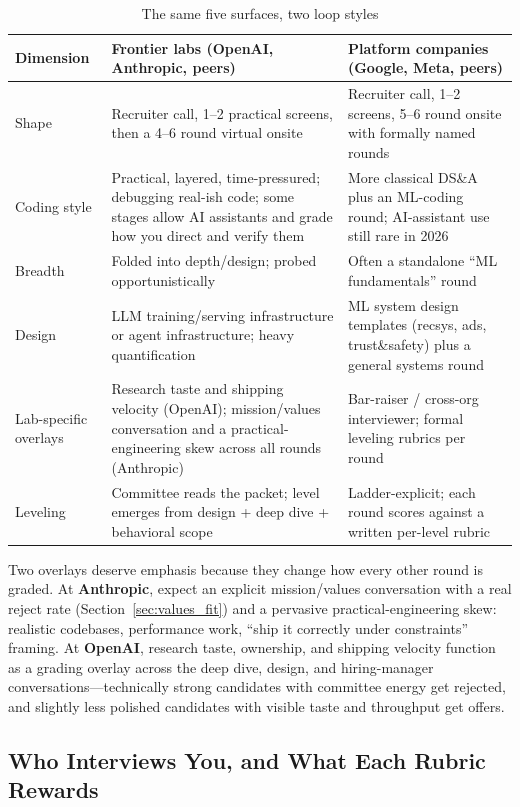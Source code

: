 \begin{table}[H]
\centering
\small
\caption{The same five surfaces, two loop styles}
\label{tab:loop_styles}
\begin{tabularx}{\textwidth}{lXX}
\toprule
\textbf{Dimension} & \textbf{Frontier labs (OpenAI, Anthropic, peers)} & \textbf{Platform companies (Google, Meta, peers)} \\
\midrule
Shape & Recruiter call, 1--2 practical screens, then a 4--6 round virtual onsite & Recruiter call, 1--2 screens, 5--6 round onsite with formally named rounds \\
Coding style & Practical, layered, time-pressured; debugging real-ish code; some stages allow AI assistants and grade how you direct and verify them & More classical DS\&A plus an ML-coding round; AI-assistant use still rare in 2026 \\
Breadth & Folded into depth/design; probed opportunistically & Often a standalone ``ML fundamentals'' round \\
Design & LLM training/serving infrastructure or agent infrastructure; heavy quantification & ML system design templates (recsys, ads, trust\&safety) plus a general systems round \\
Lab-specific overlays & Research taste and shipping velocity (OpenAI); mission/values conversation and a practical-engineering skew across all rounds (Anthropic) & Bar-raiser / cross-org interviewer; formal leveling rubrics per round \\
Leveling & Committee reads the packet; level emerges from design + deep dive + behavioral scope & Ladder-explicit; each round scores against a written per-level rubric \\
\bottomrule
\end{tabularx}
\end{table}

Two overlays deserve emphasis because they change how every other round is graded. At \textbf{Anthropic}, expect an explicit mission/values conversation with a real reject rate (Section~\ref{sec:values_fit}) and a pervasive practical-engineering skew: realistic codebases, performance work, ``ship it correctly under constraints'' framing. At \textbf{OpenAI}, research taste, ownership, and shipping velocity function as a grading overlay across the deep dive, design, and hiring-manager conversations---technically strong candidates with committee energy get rejected, and slightly less polished candidates with visible taste and throughput get offers.

\subsection{Who Interviews You, and What Each Rubric Rewards}

